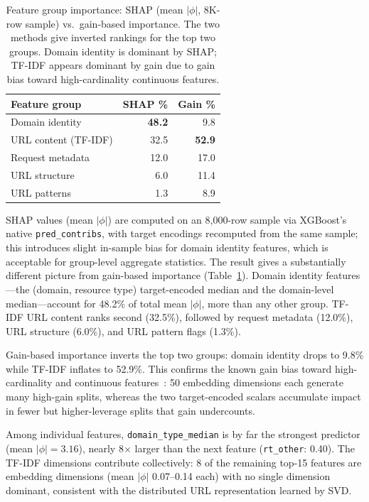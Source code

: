 \documentclass[sigconf,nonacm]{acmart}
\begin{document}
\begin{table}[t]
\centering
\small
\begin{tabular}{lrr}
\toprule
Feature group & SHAP \% & Gain \% \\
\midrule
Domain identity & \textbf{48.2} & 9.8 \\
URL content (TF-IDF) & 32.5 & \textbf{52.9} \\
Request metadata & 12.0 & 17.0 \\
URL structure & 6.0 & 11.4 \\
URL patterns & 1.3 & 8.9 \\
\bottomrule
\end{tabular}
\caption{Feature group importance: SHAP (mean $|\phi|$, 8K-row sample) vs.\ gain-based importance. The two methods give inverted rankings for the top two groups. Domain identity is dominant by SHAP; TF-IDF appears dominant by gain due to gain bias toward high-cardinality continuous features.}
\label{tab:shap-vs-gain}
\end{table}

SHAP values (mean $|\phi|$) are computed on an 8,000-row sample via XGBoost's native \texttt{pred\_contribs}, with target encodings recomputed from the same sample; this introduces slight in-sample bias for domain identity features, which is acceptable for group-level aggregate statistics.
The result gives a substantially different picture from gain-based importance (Table~\ref{tab:shap-vs-gain}).
Domain identity features---the (domain, resource type) target-encoded median and the domain-level median---account for 48.2\% of total mean $|\phi|$, more than any other group.
TF-IDF URL content ranks second (32.5\%), followed by request metadata (12.0\%), URL structure (6.0\%), and URL pattern flags (1.3\%).

Gain-based importance inverts the top two groups: domain identity drops to 9.8\% while TF-IDF inflates to 52.9\%.
This confirms the known gain bias toward high-cardinality and continuous features~\cite{lundberg2017shap}: 50 embedding dimensions each generate many high-gain splits, whereas the two target-encoded scalars accumulate impact in fewer but higher-leverage splits that gain undercounts.

Among individual features, \texttt{domain\_type\_median} is by far the strongest predictor (mean $|\phi| = 3.16$), nearly 8$\times$ larger than the next feature (\texttt{rt\_other}: 0.40).
The TF-IDF dimensions contribute collectively: 8 of the remaining top-15 features are embedding dimensions (mean $|\phi|$ 0.07--0.14 each) with no single dimension dominant, consistent with the distributed URL representation learned by SVD.
\end{document}
